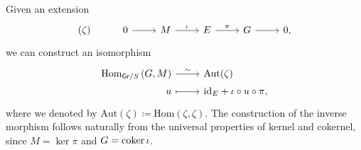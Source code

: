 \begin{rem}[]\label{rem:CorrExtAutMor}
	Given an extension
	\begin{equation*}
	\begin{tikzcd}
		(\zeta) &
		0 \arrow[r, "", rightarrow] &
		M \arrow[r, "\iota", rightarrow] &
		E \arrow[r, "\pi", rightarrow] &
		G \arrow[r, "", rightarrow] &
		0
	,\end{tikzcd}
	\end{equation*}
	we can construct an isomorphism
	\begin{equation*}
	\begin{tikzcd}[row sep = 0ex
		,/tikz/column 1/.append style={anchor=base east}
		,/tikz/column 2/.append style={anchor=base west}]
		\mathrm{Hom}_{\mathsf{Gr}/S} \left( G, M \right)
		\arrow[r, "\sim", rightarrow] &
		\mathrm{Aut}(\zeta) \\
		u \arrow[r, "", mapsto] & 
		\mathrm{id}_{ E } + \iota \circ u \circ \pi
	,\end{tikzcd}
	\end{equation*} 
	where we denoted by $\mathrm{Aut}(\zeta) \coloneqq \mathrm{Hom} \left( \zeta, \zeta \right)$.
	The construction of the inverse morphism follows naturally from the 
	universal properties of kernel and cokernel, since $M = \ker \pi$
	and $G = \operatorname{coker} \iota$.
\end{rem}


